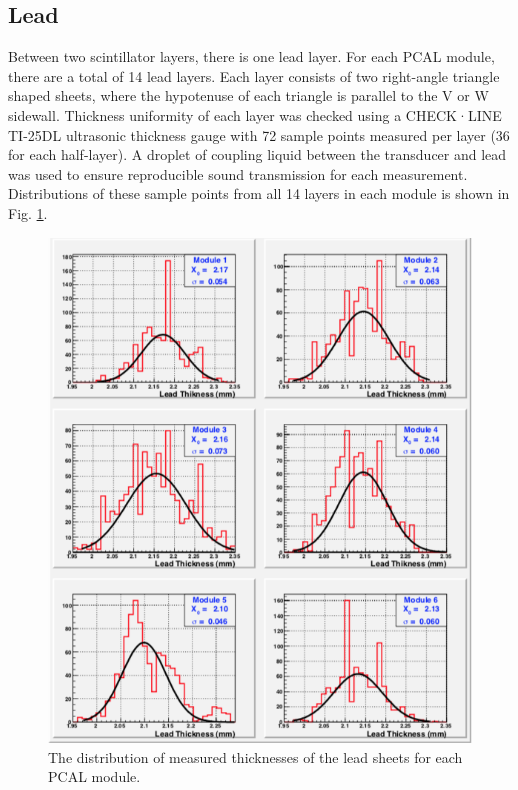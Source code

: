 \subsection{Lead}

Between two scintillator layers, there is one lead layer. For each PCAL module, there are a total of 14 lead layers. Each layer consists of two right-angle triangle shaped sheets, where the hypotenuse of each triangle is parallel to the V or W sidewall. Thickness uniformity of each layer was checked using a CHECK·LINE TI-25DL ultrasonic thickness gauge with 72 sample points measured per layer (36 for each half-layer).  A droplet of coupling liquid between the transducer and lead was used to  ensure reproducible sound transmission for each measurement.  Distributions of these sample points from all 14 layers in each module is shown in Fig. \ref{fig:S4_5}.

\begin{figure}[hbt]
\centering
\includegraphics[width=0.95\columnwidth,keepaspectratio]{img/S4_5.png}
\caption{The distribution of measured thicknesses of the lead sheets for each PCAL module.}
\label{fig:S4_5}
\end{figure}


